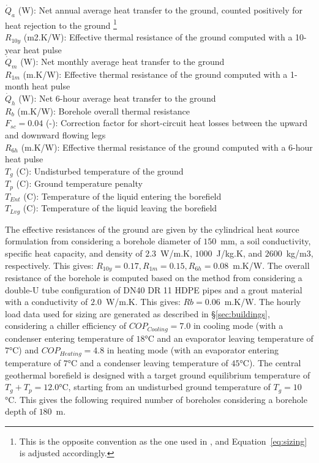 \begin{avec}
    $\dot{Q}_a$ (W): Net annual average heat transfer to the ground, counted positively for heat rejection to the ground%
    \footnote{This is the opposite convention as the one used in \cite{Cline2020}, and Equation~\ref{eq:sizing} is adjusted accordingly.}\\
    $R_{10y}$ (m2.K/W): Effective thermal resistance of the ground computed with a 10-year heat pulse \\
    $\dot{Q}_m$ (W): Net monthly average heat transfer to the ground\\
    $R_{1m}$ (m.K/W): Effective thermal resistance of the ground computed with a 1-month heat pulse \\
    $\dot{Q}_h$ (W): Net 6-hour average heat transfer to the ground\\
    $R_b$ (m.K/W): Borehole overall thermal resistance \\
    $F_{sc} = 0.04$ (-): Correction factor for short-circuit heat losses between the upward and downward flowing legs\\
    $R_{6h}$ (m.K/W): Effective thermal resistance of the ground computed with a 6-hour heat pulse \\
    $T_g$ (C): Undisturbed temperature of the ground \\
    $T_p$ (C): Ground temperature penalty \\
    $T_{Ent}$ (C): Temperature of the liquid entering the borefield \\
    $T_{Lvg}$ (C): Temperature of the liquid leaving the borefield \\
\end{avec}

The effective resistances of the ground are given by the cylindrical heat source formulation from \cite{Carslaw1947} considering a borehole diameter of $150$~mm, a soil conductivity, specific heat capacity, and density of $2.3$~W/m.K, $1000$~J/kg.K, and $2600$~kg/m3, respectively.
This gives: $R_{10y} = 0.17, R_{1m} = 0.15, R_{6h} = 0.08$~m.K/W.
The overall resistance of the borehole is computed based on the method from \cite{Cline2020} considering a double-U tube configuration of DN40 DR 11 HDPE pipes and a grout material with a conductivity of $2.0$~W/m.K. This gives: $Rb = 0.06$~m.K/W.
The hourly load data used for sizing are generated as described in §\ref{sec:buildings}, considering a chiller efficiency of $COP_{Cooling} = 7.0$ in cooling mode (with a condenser entering temperature of $18$°C and an evaporator leaving temperature of $7$°C) and $COP_{Heating} = 4.8$ in heating mode (with an evaporator entering temperature of $7$°C and a condenser leaving temperature of $45$°C).
The central geothermal borefield is designed with a target ground equilibrium temperature of $T_g+ T_p = 12.0$°C, starting from an undisturbed ground temperature of $T_g = 10$°C.
This gives the following required number of boreholes considering a borehole depth of $180$~m.

